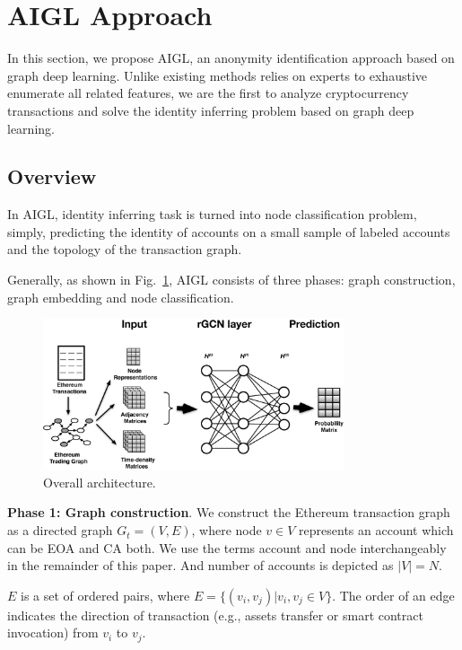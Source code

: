 \section{AIGL Approach}
\label{sec:approach}
In this section, we propose AIGL, an anonymity identification approach based on graph deep learning. Unlike existing methods relies on experts to exhaustive enumerate all related features, we are the first to analyze cryptocurrency transactions and solve the identity inferring problem based on graph deep learning.

\subsection{Overview}
\label{subsec:methodology}
In AIGL, identity inferring task is turned into node classification problem, simply, predicting the identity of accounts on a small sample of labeled accounts and the topology of the transaction graph.

Generally, as shown in Fig.~\ref{fig:architecture}, AIGL consists of three phases: graph construction, graph embedding and node classification.

\begin{figure}[htbp]
	\centering
	\includegraphics[width=3.5in]{fig/architecture.eps}
	\caption{Overall architecture.}
	\label{fig:architecture}
\end{figure}

\textbf{Phase 1: Graph construction}. We construct the Ethereum transaction graph as a directed graph $G_{t}=(V,E)$, where node $v \in V$ represents an account which can be EOA and CA both. We use the terms account and node interchangeably in the remainder of this paper. And number of accounts is depicted as $|V|=N$.

$E$ is a set of ordered pairs, where $E=\{(v_i,v_j)|v_i,v_j \in V\}$. The order of an edge indicates the direction of transaction (e.g., assets transfer or smart contract invocation) from $v_i$ to $v_j$.%


